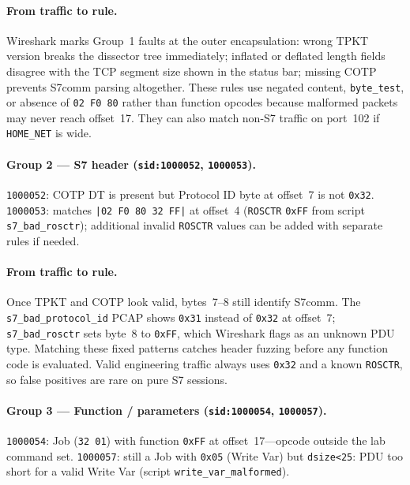 \paragraph{From traffic to rule.}
Wireshark marks Group~1 faults at the outer encapsulation: wrong TPKT version breaks the dissector tree immediately; inflated or deflated length fields disagree with the TCP segment size shown in the status bar; missing COTP prevents S7comm parsing altogether. These rules use negated content, \texttt{byte\_test}, or absence of \texttt{02 F0 80} rather than function opcodes because malformed packets may never reach offset~17. They can also match non-S7 traffic on port~102 if \texttt{HOME\_NET} is wide.

\paragraph{Group 2 --- S7 header (\texttt{sid:1000052}, \texttt{1000053}).}

\texttt{1000052}: COTP DT is present but Protocol ID byte at offset~7 is not \texttt{0x32}. \texttt{1000053}: matches \texttt{|02 F0 80 32 FF|} at offset~4 (\texttt{ROSCTR} \texttt{0xFF} from script \texttt{s7\_bad\_rosctr}); additional invalid \texttt{ROSCTR} values can be added with separate rules if needed.

\paragraph{From traffic to rule.}
Once TPKT and COTP look valid, bytes~7--8 still identify S7comm. The \texttt{s7\_bad\_protocol\_id} PCAP shows \texttt{0x31} instead of \texttt{0x32} at offset~7; \texttt{s7\_bad\_rosctr} sets byte~8 to \texttt{0xFF}, which Wireshark flags as an unknown PDU type. Matching these fixed patterns catches header fuzzing before any function code is evaluated. Valid engineering traffic always uses \texttt{0x32} and a known \texttt{ROSCTR}, so false positives are rare on pure S7 sessions.

\paragraph{Group 3 --- Function / parameters (\texttt{sid:1000054}, \texttt{1000057}).}

\texttt{1000054}: Job (\texttt{32 01}) with function \texttt{0xFF} at offset~17---opcode outside the lab command set. \texttt{1000057}: still a Job with \texttt{0x05} (Write Var) but \texttt{dsize<25}: PDU too short for a valid Write Var (script \texttt{write\_var\_malformed}).

